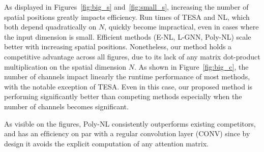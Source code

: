 \documentclass[10pt,twocolumn,letterpaper]{article}
\begin{document}
As displayed in Figures~\ref{fig:big_s} and~\ref{fig:small_s}, increasing the number of spatial positions greatly impacts efficiency. Run times of TESA and NL, which both depend quadratically on $N$, quickly become impractical, even in cases where the input dimension is small. Efficient methods (E-NL, L-GNN, Poly-NL) scale better with increasing spatial positions. Nonetheless, our method holds a competitive advantage across all figures, due to its lack of any matrix dot-product multiplication on the spatial dimension $N$. As shown in Figure~\ref{fig:big_c}, the number of channels impact linearly the runtime performance of most methods, with the notable exception of TESA. Even in this case, our proposed method is performing significantly better than competing methods especially when the number of channels becomes significant. 

As visible on the figures, Poly-NL consistently outperforms existing competitors, and has an efﬁciency on par with a regular convolution layer (CONV) since by design it avoids the explicit computation of any attention matrix.
\end{document}

